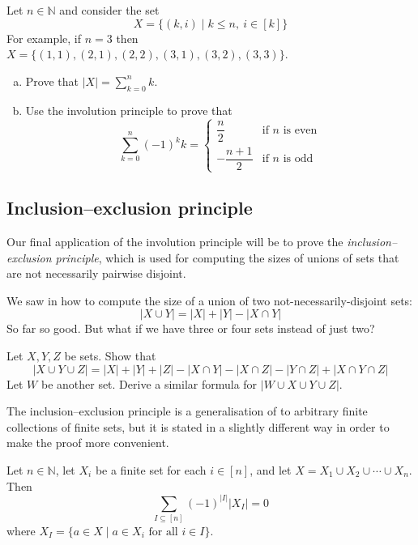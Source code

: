 \begin{exercise}
Let $n \in \mathbb{N}$ and consider the set
\[ X = \{ (k,i) \mid k \le n,~ i \in [k] \} \]
For example, if $n=3$ then $X = \{ (1,1), (2,1), (2,2), (3,1), (3,2), (3,3) \}$.

\begin{enumerate}[(a)]
\item Prove that $|X| = \displaystyle \sum_{k=0}^n k$.
\item Use the involution principle to prove that
\[ \sum_{k=0}^n (-1)^k k = \begin{cases} \dfrac{n}{2} & \text{if $n$ is even} \\ -\dfrac{n+1}{2} & \text{if $n$ is odd } \end{cases} \]
\end{enumerate}
\end{exercise}

\subsection*{Inclusion--exclusion principle}

Our final application of the involution principle will be to prove the \textit{inclusion--exclusion principle}, which is used for computing the sizes of unions of sets that are not necessarily pairwise disjoint.

We saw in  how to compute the size of a union of two not-necessarily-disjoint sets:
\[ |X \cup Y| = |X| + |Y| - |X \cap Y| \]
So far so good. But what if we have three or four sets instead of just two?

\begin{exercise}
\label{exSizeOfUnionOf3Or4Sets}
Let $X,Y,Z$ be sets. Show that
\[ |X \cup Y \cup Z| = |X| + |Y| + |Z| - |X \cap Y| - |X \cap Z| - |Y \cap Z| + |X \cap Y \cap Z| \]
Let $W$ be another set. Derive a similar formula for $|W \cup X \cup Y \cup Z|$.
\end{exercise}

The inclusion--exclusion principle is a generalisation of  to arbitrary finite collections of finite sets, but it is stated in a slightly different way in order to make the proof more convenient.

\begin{theorem}
\label{thmInclusionExclusion}
Let $n \in \mathbb{N}$, let $X_i$ be a finite set for each $i \in [n]$, and let $X = X_1 \cup X_2 \cup \cdots \cup X_n$. Then
\[ \sum_{I \subseteq [n]} (-1)^{|I|} |X_I| = 0 \]
where $X_I = \{ a \in X \mid a \in X_i \text{ for all } i \in I \}$. 
\end{theorem}

